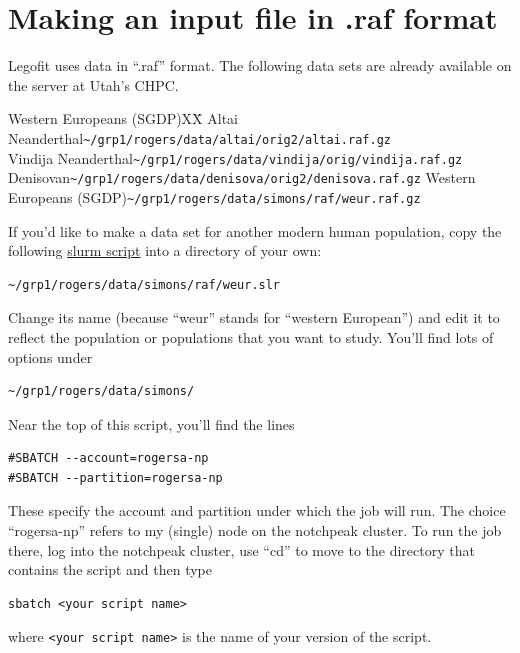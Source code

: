 \documentclass[11pt]{article}
\newenvironment{leftindent}%
{\begin{list}{}%
         {\setlength{\leftmargin}{2em}}%
         \item[]%
}{\end{list}}
\begin{document}
\section{Making an input file in .raf format}
\label{sec.raf}
Legofit uses data in ``.raf'' format. The following data sets are
already available on the server at Utah's CHPC.
\begin{leftindent}
\begin{tabbing}
Western Europeans (SGDP)XX\=\kill    
Altai Neanderthal\>\verb|~/grp1/rogers/data/altai/orig2/altai.raf.gz|\\
Vindija Neanderthal\>\verb|~/grp1/rogers/data/vindija/orig/vindija.raf.gz|\\
Denisovan\>\verb|~/grp1/rogers/data/denisova/orig2/denisova.raf.gz|\kill
Western Europeans (SGDP)\>\verb|~/grp1/rogers/data/simons/raf/weur.raf.gz|
\end{tabbing}
\end{leftindent}
If you'd like to make a data set for another modern human population,
copy the following
\href{https://alanrogers.github.io/agar22/legofit/weur.slr.html}{slurm
  script} into a directory of your own:
\begin{verbatim}
~/grp1/rogers/data/simons/raf/weur.slr
\end{verbatim}
Change its name (because ``weur'' stands for ``western European'') and
edit it to reflect the population or populations that you want to
study. You'll find lots of options under
\begin{verbatim}
~/grp1/rogers/data/simons/
\end{verbatim}
Near the top of this script, you'll find the lines
\begin{verbatim}
#SBATCH --account=rogersa-np
#SBATCH --partition=rogersa-np
\end{verbatim}
These specify the account and partition under which the job will
run. The choice ``rogersa-np'' refers to my (single) node on the
notchpeak cluster. To run the job there, log into the notchpeak
cluster, use ``cd'' to move to the directory that contains the script
and then type
\begin{verbatim}
sbatch <your script name>
\end{verbatim}
where \verb|<your script name>| is the name of your version of the
script.
\end{document}
